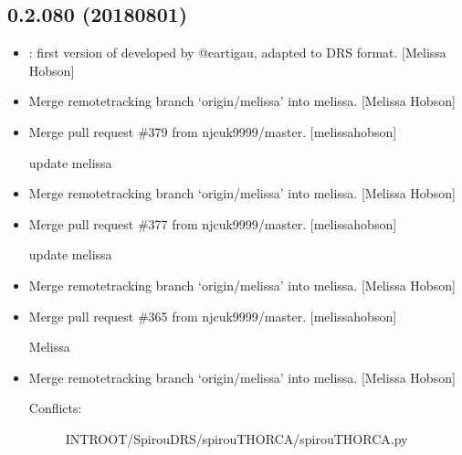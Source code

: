 \documentclass[a4paper,10pt,english]{report}
\begin{document}
\subsection{0.2.080 (2018\sphinxhyphen{}08\sphinxhyphen{}01)}
\label{\detokenize{misc/changelog:id401}}\begin{itemize}
\item {} 
: first version of  developed by
@eartigau, adapted to DRS format. {[}Melissa Hobson{]}

\item {} 
Merge remote\sphinxhyphen{}tracking branch ‘origin/melissa’ into melissa. {[}Melissa
Hobson{]}

\item {} 
Merge pull request \#379 from njcuk9999/master. {[}melissa\sphinxhyphen{}hobson{]}

update melissa

\item {} 
Merge remote\sphinxhyphen{}tracking branch ‘origin/melissa’ into melissa. {[}Melissa
Hobson{]}

\item {} 
Merge pull request \#377 from njcuk9999/master. {[}melissa\sphinxhyphen{}hobson{]}

update melissa

\item {} 
Merge remote\sphinxhyphen{}tracking branch ‘origin/melissa’ into melissa. {[}Melissa
Hobson{]}

\item {} 
Merge pull request \#365 from njcuk9999/master. {[}melissa\sphinxhyphen{}hobson{]}

Melissa

\item {} 
Merge remote\sphinxhyphen{}tracking branch ‘origin/melissa’ into melissa. {[}Melissa
Hobson{]}
\begin{description}
\item[{Conflicts:}] \leavevmode
INTROOT/SpirouDRS/spirouTHORCA/spirouTHORCA.py

\end{description}

\end{itemize}
\end{document}
